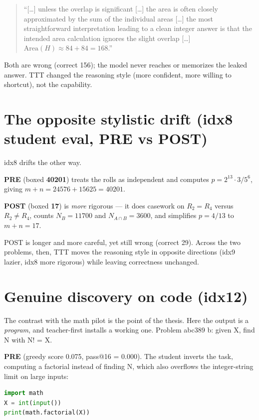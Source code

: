 \begin{quote}
``{[\ldots]} unless the overlap is significant {[\ldots]} the area is often closely approximated by the sum of the individual areas {[\ldots]} the most straightforward interpretation leading to a clean integer answer is that the intended area calculation ignores the slight overlap {[\ldots]} \(\text{Area}(H) \approx 84 + 84 = 168\).''
\end{quote}

Both are wrong (correct 156); the model never reaches or memorizes the leaked answer. TTT changed the reasoning style (more confident, more willing to shortcut), not the capability.

\section{The opposite stylistic drift (idx8 student eval, PRE vs POST)}\label{d.4-the-opposite-stylistic-drift-idx8-student-eval-pre-vs-post}

idx8 drifts the other way.

\textbf{PRE} (boxed \textbf{40201}) treats the rolls as independent and computes \(p = 2^{13}\cdot 3 / 5^6\), giving \(m+n = 24576 + 15625 = 40201\).

\textbf{POST} (boxed \textbf{17}) is \emph{more} rigorous --- it does casework on \(R_2 = R_4\) versus \(R_2 \neq R_4\), counts \(N_B = 11700\) and \(N_{A\cap B} = 3600\), and simplifies \(p = 4/13\) to \(m+n = 17\).

POST is longer and more careful, yet still wrong (correct 29). Across the two problems, then, TTT moves the reasoning style in opposite directions (idx9 lazier, idx8 more rigorous) while leaving correctness unchanged.

\section{Genuine discovery on code (idx12)}\label{d.5-genuine-discovery-on-code-idx12-run-teacherfirst-...-idx12}

The contrast with the math pilot is the point of the thesis. Here the output is a \emph{program}, and teacher-first installs a working one. Problem abc389 b: given X, find N with N! = X.

\textbf{PRE} (greedy score 0.075, pass@16 = 0.000). The student inverts the task, computing a factorial instead of finding N, which also overflows the integer-string limit on large inputs:

\begin{lstlisting}[language=Python]
import math
X = int(input())
print(math.factorial(X))
\end{lstlisting}


